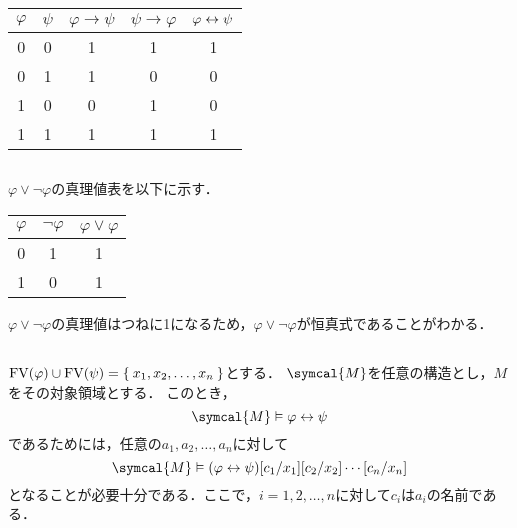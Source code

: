 \begin{table}[htbp]
	\centering
	\begin{tabular}{cc|ccc}
		\hline
		\(\varphi\) & \(\psi\) & \(\varphi \to \psi\) & \(\psi \to \varphi\) & \(\varphi \leftrightarrow \psi\) \\ \hline
		0           & 0        & 1                    & 1                    & 1                              \\
		0           & 1        & 1                    & 0                    & 0                              \\
		1           & 0        & 0                    & 1                    & 0                              \\
		1           & 1        & 1                    & 1                    & 1                              \\
		\hline
	\end{tabular}
\end{table}

\subsection*{}

\(\varphi \lor \lnot \varphi\)の真理値表を以下に示す．

\begin{table}[htbp]
	\centering
	\begin{tabular}{c|cc}
		\hline
		\(\varphi\) & \(\lnot \varphi\) & \(\varphi \lor \varphi\) \\ \hline
		0           & 1                 & 1                        \\
		1           & 0                 & 1                        \\
		\hline
	\end{tabular}
\end{table}

\(\varphi \lor \lnot \varphi\)の真理値はつねに1になるため，\(\varphi \lor \lnot \varphi\)が恒真式であることがわかる．

\subsection*{}

\(\apply{\FV}{\varphi} \cup \apply{\FV}{\psi} = \Set{x_1, x_2, \dots, x_n}\)とする．
\(\symcal{M}\)を任意の構造とし，\(M\)をその対象領域とする．
このとき，
\[
	\symcal{M} \satisfy \varphi \formulaequiv \psi
\]
であるためには，任意の\(a_1,a_2, \dots, a_n\)に対して
\[
	\symcal{M} \satisfy \subst{\subst{\subst{\paren{\varphi \formulaequiv \psi}}{c_1/x_1}}{c_2/x_2} \dotsb}{c_n/x_n}
\]
となることが必要十分である．ここで，\(i = 1,2,\dots,n\)に対して\(c_i\)は\(a_i\)の名前である．

